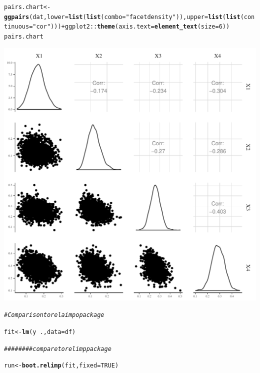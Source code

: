 \documentclass[11pt,a4paper,twoside]{book}
\makeatletter
\def\maxwidth{ %
  \ifdim\Gin@nat@width>\linewidth
    \linewidth
  \else
    \Gin@nat@width
  \fi
}
\newcommand{\hlnum}[1]{\textcolor[rgb]{0.686,0.059,0.569}{#1}}%
\newcommand{\hlstr}[1]{\textcolor[rgb]{0.192,0.494,0.8}{#1}}%
\newcommand{\hlcom}[1]{\textcolor[rgb]{0.678,0.584,0.686}{\textit{#1}}}%
\newcommand{\hlopt}[1]{\textcolor[rgb]{0,0,0}{#1}}%
\newcommand{\hlstd}[1]{\textcolor[rgb]{0.345,0.345,0.345}{#1}}%
\newcommand{\hlkwb}[1]{\textcolor[rgb]{0.69,0.353,0.396}{#1}}%
\newcommand{\hlkwc}[1]{\textcolor[rgb]{0.333,0.667,0.333}{#1}}%
\newcommand{\hlkwd}[1]{\textcolor[rgb]{0.737,0.353,0.396}{\textbf{#1}}}%
\newenvironment{kframe}{%
 \def\at@end@of@kframe{}%
 \ifinner\ifhmode%
  \def\at@end@of@kframe{\end{minipage}}%
  \begin{minipage}{\columnwidth}%
 \fi\fi%
 \def\FrameCommand##1{\hskip\@totalleftmargin \hskip-\fboxsep
 \colorbox{shadecolor}{##1}\hskip-\fboxsep
     \hskip-\linewidth \hskip-\@totalleftmargin \hskip\columnwidth}%
 \MakeFramed {\advance\hsize-\width
   \@totalleftmargin\z@ \linewidth\hsize
   \@setminipage}}%
 {\par\unskip\endMakeFramed%
 \at@end@of@kframe}
\newenvironment{knitrout}{}{} %
\makeatother
\begin{document}
\begin{knitrout}
\begin{kframe}
\begin{alltt}
\hlstd{pairs.chart} \hlkwb{<-} \hlkwd{ggpairs}\hlstd{(dat,} \hlkwc{lower} \hlstd{=} \hlkwd{list}\hlstd{(}\hlkwd{list}\hlstd{(}\hlkwc{combo} \hlstd{=} \hlstr{"facetdensity"}\hlstd{)),} \hlkwc{upper} \hlstd{=} \hlkwd{list}\hlstd{(}\hlkwd{list}\hlstd{(}\hlkwc{continuous} \hlstd{=} \hlstr{"cor"}\hlstd{)))} \hlopt{+} \hlstd{ggplot2}\hlopt{::}\hlkwd{theme}\hlstd{(}\hlkwc{axis.text} \hlstd{=} \hlkwd{element_text}\hlstd{(}\hlkwc{size} \hlstd{=} \hlnum{6}\hlstd{))}
\hlstd{pairs.chart}
\end{alltt}
\end{kframe}
\includegraphics[width=\maxwidth]{figure/ch03_figsimdata_LMG-1} 
\begin{kframe}\begin{alltt}
\hlcom{# Comparison to relaimpo package}

\hlstd{fit} \hlkwb{<-} \hlkwd{lm}\hlstd{(y}\hlopt{~}\hlstd{.,} \hlkwc{data}\hlstd{=df)}

\hlcom{######## compare to relimp package}

\hlstd{run}\hlkwb{<-}\hlkwd{boot.relimp}\hlstd{(fit,} \hlkwc{fixed}\hlstd{=}\hlnum{TRUE}\hlstd{)}


\end{alltt}
\end{kframe}
\end{knitrout}
\end{document}
